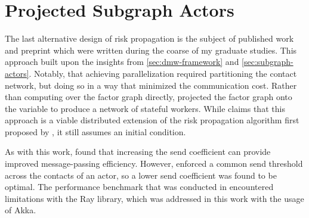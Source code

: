 \section{Projected Subgraph Actors}\label{sec:projected-subgraphs}

The last alternative design of risk propagation is the subject of published work \citep{Tatton2022b} and preprint \citep{Tatton2022a} which were written during the coarse of my graduate studies. This approach built upon the insights from \cref{sec:dmw-framework} and \cref{sec:subgraph-actors}. Notably, that achieving parallelization required partitioning the contact network, but doing so in a way that minimized the communication cost. Rather than computing over the factor graph directly, \citet{Tatton2022b} projected the factor graph onto the variable \verticesName to produce a network of stateful workers. While \citet{Tatton2022b} claims that this approach is a viable distributed extension of the risk propagation algorithm first proposed by \citet{Ayday2021}, it still assumes an initial condition.

As with this work, \citet{Tatton2022b} found that increasing the send coefficient can provide improved message-passing efficiency. However, \citet{Tatton2022b} enforced a common send threshold across the contacts of an actor, so a lower send coefficient was found to be optimal. The performance benchmark that was conducted in \citet{Tatton2022b} encountered limitations with the Ray library, which was addressed in this work with the usage of Akka.



